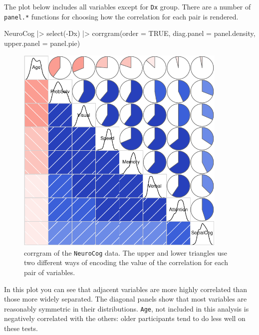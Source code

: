 \documentclass[
  letterpaper,
  10pt,
  krantz2]{krantz}
\makeatletter
\newenvironment{Shaded}{\begin{snugshade}}{\end{snugshade}}
\newcommand{\AttributeTok}[1]{\textcolor[rgb]{0.40,0.45,0.13}{#1}}
\newcommand{\ConstantTok}[1]{\textcolor[rgb]{0.56,0.35,0.01}{#1}}
\newcommand{\FunctionTok}[1]{\textcolor[rgb]{0.28,0.35,0.67}{#1}}
\newcommand{\NormalTok}[1]{\textcolor[rgb]{0.00,0.23,0.31}{#1}}
\newcommand{\SpecialCharTok}[1]{\textcolor[rgb]{0.37,0.37,0.37}{#1}}
\newenvironment{kframe}{%
  \medskip{}
  \setlength{\fboxsep}{.8em}
  \def\at@end@of@kframe{}%
  \ifinner\ifhmode%
  \def\at@end@of@kframe{\end{minipage}}%
  \begin{minipage}{\columnwidth}%
  \fi\fi%
  \def\FrameCommand##1{\hskip\@totalleftmargin \hskip-\fboxsep
  \colorbox{shadecolor}{##1}\hskip-\fboxsep
      \hskip-\linewidth \hskip-\@totalleftmargin \hskip\columnwidth}%
  \MakeFramed {\advance\hsize-\width
    \@totalleftmargin\z@ \linewidth\hsize
    \@setminipage}}%
{\par\unskip\endMakeFramed%
  \at@end@of@kframe}
\renewenvironment{Shaded}{\begin{kframe}}{\end{kframe}}
\makeatother
\begin{document}
The plot below includes all variables except for \texttt{Dx} group.
There are a number of \texttt{panel.*} functions for choosing how the
correlation for each pair is rendered.

\begin{Shaded}
\begin{Highlighting}[]
\NormalTok{NeuroCog }\SpecialCharTok{|\textgreater{}}
  \FunctionTok{select}\NormalTok{(}\SpecialCharTok{{-}}\NormalTok{Dx) }\SpecialCharTok{|\textgreater{}}
  \FunctionTok{corrgram}\NormalTok{(}\AttributeTok{order =} \ConstantTok{TRUE}\NormalTok{,}
           \AttributeTok{diag.panel =}\NormalTok{ panel.density,}
           \AttributeTok{upper.panel =}\NormalTok{ panel.pie)}
\end{Highlighting}
\end{Shaded}

\begin{figure}[H]

{\centering \includegraphics[width=0.9\textwidth,height=\textheight]{figs/fig-NC-corrgram-1.pdf}

}

\caption{\label{fig-NC-corrgram}corrgram of the \texttt{NeuroCog} data.
The upper and lower triangles use two different ways of encoding the
value of the correlation for each pair of variables.}

\end{figure}

In this plot you can see that adjacent variables are more highly
correlated than those more widely separated. The diagonal panels show
that most variables are reasonably symmetric in their distributions.
\texttt{Age}, not included in this analysis is negatively correlated
with the others: older participants tend to do less well on these tests.
\end{document}
